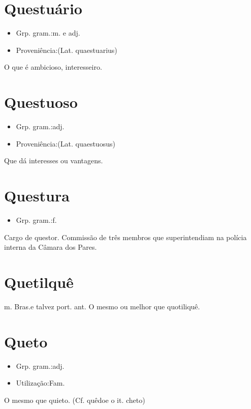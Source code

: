 \section{Questuário}
\begin{itemize}
\item {Grp. gram.:m.  e  adj.}
\end{itemize}
\begin{itemize}
\item {Proveniência:(Lat. \textunderscore quaestuarius\textunderscore )}
\end{itemize}
O que é ambicioso, interesseiro.
\section{Questuoso}
\begin{itemize}
\item {Grp. gram.:adj.}
\end{itemize}
\begin{itemize}
\item {Proveniência:(Lat. \textunderscore quaestuosus\textunderscore )}
\end{itemize}
Que dá interesses ou vantagens.
\section{Questura}
\begin{itemize}
\item {Grp. gram.:f.}
\end{itemize}
Cargo de questor.
Commissão de três membros que superintendiam na polícia interna da Câmara dos Pares.
\section{Quetilquê}
\textunderscore m. Bras.\textunderscore  e talvez \textunderscore port. ant.\textunderscore 
O mesmo ou melhor que \textunderscore quotiliquê\textunderscore .
\section{Queto}
\begin{itemize}
\item {Grp. gram.:adj.}
\end{itemize}
\begin{itemize}
\item {Utilização:Fam.}
\end{itemize}
O mesmo que \textunderscore quieto\textunderscore .
(Cf. \textunderscore quêdo\textunderscore  e o it. \textunderscore cheto\textunderscore )
